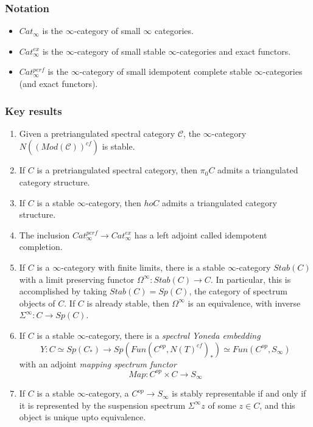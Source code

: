 \documentclass[letterpaper]{article}
\theoremstyle{definition}
\newcommand{\mc}{\mathcal}
\begin{document}
\subsubsection{Notation}

\begin{itemize}
\item $Cat_\infty$ is the $\infty$-category of small $\infty$ categories.
\item $Cat^{ex}_\infty$ is the $\infty$-category of small stable $\infty$-categories and exact functors. 
\item $Cat^{perf}_\infty$ is the $\infty$-category of small idempotent complete stable $\infty$-categories (and exact functors).
\end{itemize}

\subsubsection{Key results}

\begin{enumerate}
\item Given a pretriangulated spectral category $\mc C$, the
  $\infty$-category $N((Mod(\mc C))^{cf})$ is stable. 

\item If $C$ is a pretriangulated spectral category, then $\pi_0 C$ admits a triangulated category structure.

\item If $C$ is a stable $\infty$-category, then $ho C$ admits a triangulated category structure. 

\item The inclusion $Cat^{perf}_\infty \rightarrow Cat^{ex}_\infty$ has a left adjoint called idempotent completion.

\item If $C$ is a $\infty$-category with finite limits, there is a stable $\infty$-category $Stab(C)$ with a limit preserving functor $\Omega^\infty : Stab(C) \rightarrow C$. In particular, this is accomplished by taking $Stab(C) = Sp(C)$, the category of spectrum objects of $C$. If $C$ is already stable, then $\Omega^\infty$ is an equivalence, with inverse $\Sigma^\infty : C \rightarrow Sp(C)$. 

\item If $C$ is a stable $\infty$-category, there is a \textit{spectral Yoneda embedding}
$$Y : C \simeq Sp(C_*) \rightarrow Sp(Fun(C^{op}, N(T)^{cf})_*) \simeq Fun(C^{op}, S_\infty)$$
with an adjoint \textit{mapping spectrum functor}
$$Map : C^{op} \times C \rightarrow S_\infty$$

\item If $C$ is a stable $\infty$-category, a $C^{op} \rightarrow S_\infty$ is stably representable if and only if it is represented by the suspension spectrum $\Sigma^\infty z$ of some $z \in C$, and this object is unique upto equivalence. 

\end{enumerate}
\end{document}
